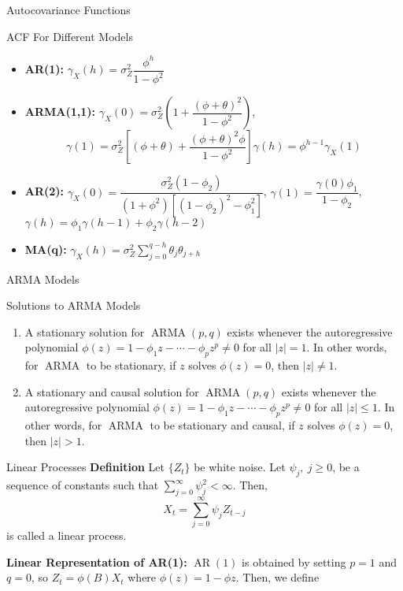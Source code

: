 \documentclass{article}
\DeclareMathOperator{\arma}{ARMA}
\DeclareMathOperator{\ar}{AR}
\begin{document}
\begin{multicols*}{3}
\begin{blackbox}{Autocovariance Functions}
\begin{bluebox}{ACF For Different Models}
\begin{itemize}[leftmargin=5pt]
            \item \textbf{AR(1):} $\gamma_X(h) = \sigma_Z^2\dfrac{\phi^h}{1-\phi^2}$
            \item \textbf{ARMA(1,1):} $\gamma_X(0) = \sigma_Z^2\left(1+\dfrac{(\phi + \theta)^2}{1-\phi^2}\right)$, 
            \[\gamma(1) = \sigma_Z^2\left[(\phi+\theta) + \frac{(\phi+\theta)^2\phi}{1-\phi^2}\right]\gamma(h) = \phi^{h-1}\gamma_X(1)\]
            \raggedright
            \item \textbf{AR(2):} $\gamma_X(0) = \dfrac{\sigma_Z^2(1-\phi_2)}{(1+\phi^2)[(1-\phi_2)^2-\phi_1^2]}$, $\gamma(1) =  \dfrac{\gamma(0)\phi_1}{1-\phi_2}$, $\gamma(h) = \phi_1\gamma(h-1) + \phi_2\gamma(h-2)$
            \item \textbf{MA(q):} $\gamma_X(h) = \sigma_Z^2\sum\limits_{j=0}^{q-h}\theta_j\theta_{j+h}$
        \end{itemize}
    \end{bluebox}
    \vspace{-1.3ex}
\end{blackbox}
\begin{blackbox}{ARMA Models}
    \begin{redbox}{Solutions to ARMA Models}
        \begin{enumerate}[label=\roman*), leftmargin=7pt]
            \item A stationary solution for $\arma(p,q)$ exists whenever the autoregressive polynomial $\phi(z) = 1 - \phi_1z - \cdots - \phi_pz^p \neq 0$ for all $|z| = 1$. In other words, for $\arma$ to be stationary, if $z$ solves $\phi(z) = 0$, then $|z| \neq 1$. 
            \item A stationary and causal solution for $\arma(p,q)$ exists whenever the autoregressive polynomial $\phi(z) = 1 - \phi_1z - \cdots - \phi_pz^p \neq 0$ for all $|z| \leq 1$. In other words, for $\arma$ to be stationary and causal, if $z$ solves $\phi(z) = 0$, then $|z| > 1$.
        \end{enumerate}
    \end{redbox}
    \begin{brownbox}{Linear Processes}
        \textbf{Definition}
            Let $\{Z_t\}$ be white noise. Let $\psi_j, \ j \geq 0$, be a sequence of constants such that $\sum_{j=0}^\infty \psi_j^2 < \infty$. Then, \\[-5ex]
            \[X_t = \sum_{j=0}^\infty \psi_jZ_{t-j}\]
            is called a linear process.
    \end{brownbox}
    \textbf{Linear Representation of AR(1):} $\ar(1)$ is obtained by setting $p=1$ and $q=0$, so $Z_t = \phi(B)X_t$ where $\phi(z) = 1-\phi z$. Then, we define \\[-3ex]

\end{blackbox}
\end{multicols*}
\end{document}
